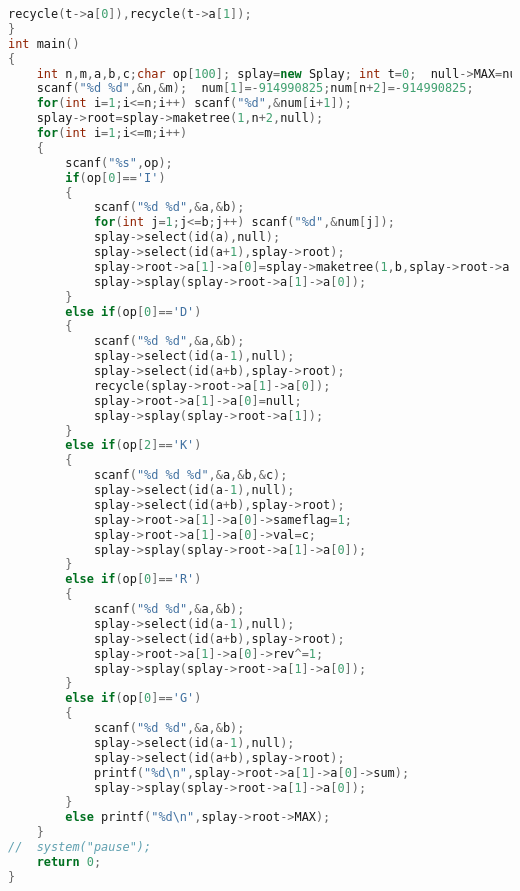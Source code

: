 \begin{lstlisting}[language=c++]
	recycle(t->a[0]),recycle(t->a[1]);	
}
int main()
{
	int n,m,a,b,c;char op[100]; splay=new Splay; int t=0;  null->MAX=null->val=null->lmax=null->rmax=-914990825;
	scanf("%d %d",&n,&m);  num[1]=-914990825;num[n+2]=-914990825;
	for(int i=1;i<=n;i++) scanf("%d",&num[i+1]);
	splay->root=splay->maketree(1,n+2,null);
	for(int i=1;i<=m;i++)
	{
		scanf("%s",op);
		if(op[0]=='I')
		{
			scanf("%d %d",&a,&b);	
			for(int j=1;j<=b;j++) scanf("%d",&num[j]);
			splay->select(id(a),null);
			splay->select(id(a+1),splay->root);
			splay->root->a[1]->a[0]=splay->maketree(1,b,splay->root->a[1]);
			splay->splay(splay->root->a[1]->a[0]);
		}
		else if(op[0]=='D')
		{
			scanf("%d %d",&a,&b);
			splay->select(id(a-1),null);
			splay->select(id(a+b),splay->root);	
			recycle(splay->root->a[1]->a[0]);
			splay->root->a[1]->a[0]=null;
			splay->splay(splay->root->a[1]);
		}
		else if(op[2]=='K')
		{
			scanf("%d %d %d",&a,&b,&c);
			splay->select(id(a-1),null);
			splay->select(id(a+b),splay->root);
			splay->root->a[1]->a[0]->sameflag=1;
			splay->root->a[1]->a[0]->val=c;
			splay->splay(splay->root->a[1]->a[0]);	
		}
		else if(op[0]=='R')
		{
			scanf("%d %d",&a,&b);
			splay->select(id(a-1),null);
			splay->select(id(a+b),splay->root);
			splay->root->a[1]->a[0]->rev^=1;
			splay->splay(splay->root->a[1]->a[0]);
		}
		else if(op[0]=='G')
		{
			scanf("%d %d",&a,&b);
			splay->select(id(a-1),null);	
			splay->select(id(a+b),splay->root);
			printf("%d\n",splay->root->a[1]->a[0]->sum); 
			splay->splay(splay->root->a[1]->a[0]);
		}
		else printf("%d\n",splay->root->MAX);
	}	
//	system("pause");
	return 0;
}
    \end{lstlisting} 
